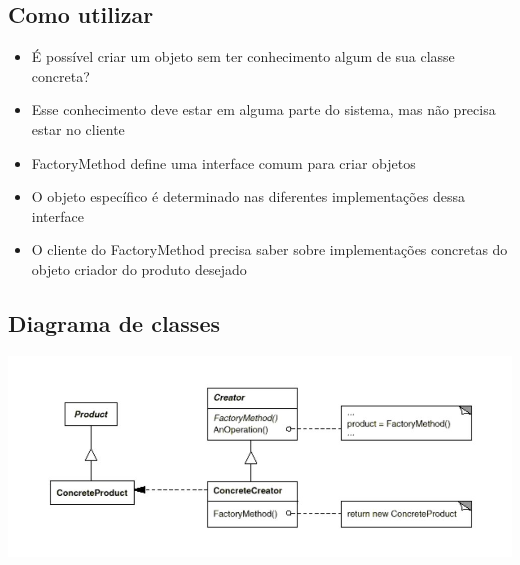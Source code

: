 \subsection{Como utilizar}
\label{sub:fac_utilizacao}

\begin{itemize}
	\item É possível criar um objeto sem ter conhecimento algum de sua classe concreta?
	\item Esse conhecimento deve estar em alguma parte do sistema, mas não precisa estar
no cliente
	\item FactoryMethod define uma interface comum para criar objetos
	\item O objeto específico é determinado nas diferentes implementações dessa interface
	\item O cliente do FactoryMethod precisa saber sobre implementações concretas do
objeto criador do produto desejado

\end{itemize}


\subsection{Diagrama de classes}
\label{sub:fac_diagrama}

\begin{center}
	\includegraphics[scale=0.40]{Figuras/image2.jpg}
	\label{fig:diagrama2}
\end{center}

